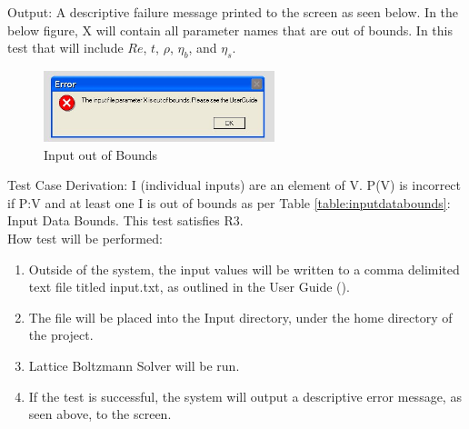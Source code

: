 \documentclass[12pt, titlepage]{article}
\newcommand{\famname}{Lattice Boltzmann Solver}
\begin{document}
\begin{enumerate}
Output: A descriptive failure message printed to the screen as seen below. In
the below figure, X will contain all parameter names that are out of bounds. In
this test that will include $Re$, $t$, $\rho$, $\eta_b$, and $\eta_s$.

\begin{figure}[h!]
	\begin{center}
		\includegraphics[width=0.6\textwidth]{errorMessage.jpeg}
		\caption{Input out of Bounds}
		\label{Fig_InputError}
	\end{center}
\end{figure}

Test Case Derivation: 
I (individual inputs) are an element of V. P(V) is incorrect if P:V and at least
one I is out of bounds as per Table \ref{table:inputdatabounds}: Input Data
Bounds. This test satisfies R3.\\

How test will be performed: 

\begin{enumerate}
\item Outside of the system, the input values will be written to a comma
  delimited text file titled input.txt, as outlined in the User Guide
  (\citet{LBM_UserGuide_PM}).
\item The file will be placed into the Input directory, under the home directory
  of the project.
\item {\famname} will be run.
\item If the test is successful, the system will output a descriptive error message, as seen above, to the screen.\\
\end{enumerate}

\end{enumerate}

\end{document}
